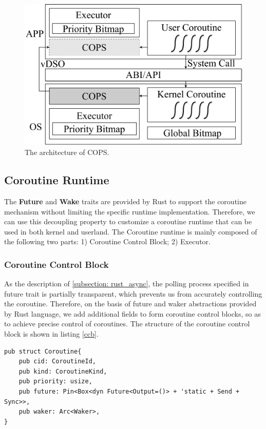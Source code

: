 \documentclass[sigconf,review,anonymous]{acmart}
\begin{document}
\begin{figure}[h]
  \centering
  \includegraphics[width=\linewidth]{assets/arch.pdf}
  \caption{The architecture of COPS.}
  \label{fig:arch}
\end{figure}

\subsection{Coroutine Runtime}
\label{section: Coroutine Runtime}

The \textbf{Future} and \textbf{Wake} traits are provided by Rust to support the coroutine mechanism without limiting the specific runtime implementation. Therefore, we can use this decoupling property to customize a coroutine runtime that can be used in both kernel and userland. The Coroutine runtime is mainly composed of the following two parts: 1) Coroutine Control Block; 2) Executor.

\subsubsection{Coroutine Control Block}

As the description of \ref{subsection: rust_async}, the polling process specified in future trait is partially transparent, which prevents us from accurately controlling the coroutine. Therefore, on the basis of future and waker abstractions provided by Rust language, we add additional fields to form coroutine control blocks, so as to achieve precise control of coroutines. The structure of the coroutine control block is shown in listing \ref{ccb}.

\begin{lstlisting}[label={ccb},caption={Coroutine control block}]
pub struct Coroutine{
    pub cid: CoroutineId,
    pub kind: CoroutineKind,
    pub priority: usize,
    pub future: Pin<Box<dyn Future<Output=()> + 'static + Send + Sync>>, 
    pub waker: Arc<Waker>,
}
\end{lstlisting}
\end{document}
